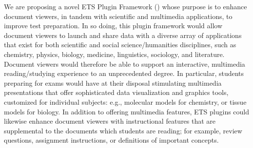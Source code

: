 \documentclass[10pt,letterpaper]{article}
\newcommand{\sectsp}{\vspace{12pt}}
\newcommand{\EPF}{\resizebox{!}{8pt}{\AcronymText{ETS{\color{pfcolor}pf}}}}
\newcommand{\ThreeD}{\resizebox{!}{8pt}{\AcronymText{3D}}}
\newcommand{\textscc}[1]{{\color{orr!35!black}{{%
						\fontfamily{Cabin-TLF}\fontseries{b}\selectfont{\textsc{\scriptsize{#1}}}}}}}
\newcommand{\AcronymText}[1]{{\textscc{#1}}}
\newcommand{\p}[1]{

\vspace{.85em}#1}
\newcommand{\llMOSAIC}{\mbox{{\LARGE MOSAIC}}}
\newcommand{\llWC}{\mbox{{\LARGE WhiteCharmDB}}}
\newcommand{\lun}[1]{\raisebox{-4pt}{\fontfamily{qcr}\selectfont{%
\LARGE{\textbf{\textcolor{tcolor}{#1}}}}}\vspace{-2pt}}
\begin{document}
	
{\linespread{1.1}\selectfont

\vspace*{-7em}

\begin{center}


\vspace{1em}


\begin{tcolorbox}
[
arc=2pt,outer arc=0pt,
enhanced jigsaw,
width=.984\textwidth,
colback=ctmpppp!30,
colframe=logoRed!30!darkRed,
drop shadow=logoPurple!50!darkRed,
]
\begin{minipage}{\textwidth}	
\begin{center}		
{\setlength{\fboxsep}{19pt}
	}
\end{center}
\end{minipage}
\end{tcolorbox}
\end{center}

\vspace{-1.5em}

\fontsize{13pt}{18pt}\selectfont
{\sectsp}
\p{We are proposing a novel ETS Plugin Framework (\EPF{}) 
whose purpose is to enhance document viewers, 
in tandem with scientific and multimedia applications, 
to improve test preparation.
In so doing, this plugin framework would allow 
document viewers to launch and share 
data with a diverse array of applications 
that exist for both scientific and social 
science/humanities disciplines, such as 
chemistry, physics, biology, 
medicine, linguistics, sociology, and literature. 
Document viewers would therefore be able to support an 
interactive, multimedia reading/studying 
experience to an unprecedented degree.  
In particular, students preparing for exams 
would have at their 
disposal stimulating multimedia presentations that offer sophisticated 
data visualization and \ThreeD{} graphics tools, 
customized for individual subjects: e.g., 
\ThreeD{} molecular models for chemistry, 
or \ThreeD{} tissue models for biology.
In addition to offering multimedia features,
ETS plugins could likewise enhance document viewers 
with instructional features that are 
supplemental to the documents which students 
are reading; for example, review questions, 
assignment instructions, or definitions of important 
concepts.}

}
\end{document}
